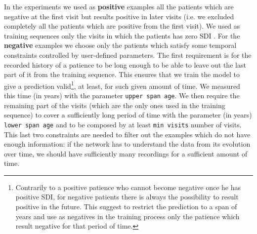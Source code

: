 In the experiments we used as \textbf{positive} examples all the patients which are negative at the first visit but results positive in later visits (i.e. we excluded completely all the patients which are positive from the first visit). We used as training sequences only the visits in which the patients has zero SDI .
For the \textbf{negative} examples we choose only the patients which satisfy some temporal constraints controlled by user-defined parameters. The first requirement is for the recorded history of a patience to be long enough to be able to leave out the last part of it from the training sequence. This ensures that we train the model to give a prediction valid\footnote{Contrarily to a positive patience who cannot become negative once he has positive SDI, for negative patients there is always the possibility to result positive in the future. This suggest to restrict the prediction to a span of years and use as negatives in the training process only the patience which result negative for that period of time.}, at least, for such given amount of time. We measured this time (in years) with the parameter \texttt{upper span age}.  We then require the remaining part of the visits (which are the only ones used in the training sequence) to cover a sufficiently long period of time with the parameter (in years) \texttt{lower span age} and to be composed by at least \texttt{min visits} number of visits. This last two constraints are needed to filter out the examples which do not have enough information: if the network has to understand the data from its evolution over time, we should have sufficiently many recordings for a sufficient amount of time.

